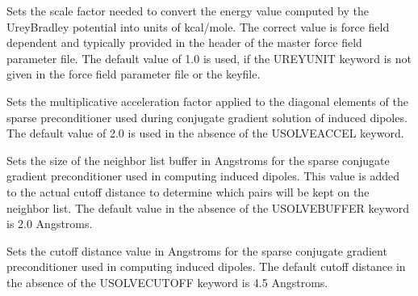 \documentclass[letterpaper,11pt,english]{sphinxmanual}
\begin{document}
\ignorespaces {}\label{\detokenize{text/keywords:key-ureyunit}}\begin{description}
\sphinxAtStartPar
Sets the scale factor needed to convert the energy value computed by the Urey\sphinxhyphen{}Bradley potential into units of kcal/mole. The correct value is force field dependent and typically provided in the header of the master force field parameter file. The default value of 1.0 is used, if the UREYUNIT keyword is not given in the force field parameter file or the keyfile.

\end{description}

\ignorespaces {}\label{\detokenize{text/keywords:key-usolve-accel}}\begin{description}
\sphinxAtStartPar
Sets the multiplicative acceleration factor applied to the diagonal elements of the sparse preconditioner used during conjugate gradient solution of induced dipoles. The default value of 2.0 is used in the absence of the USOLVE\sphinxhyphen{}ACCEL keyword.

\end{description}

\ignorespaces {}\label{\detokenize{text/keywords:key-usolve-buffer}}\begin{description}
\sphinxAtStartPar
Sets the size of the neighbor list buffer in Angstroms for the sparse conjugate gradient preconditioner used in computing induced dipoles. This value is added to the actual cutoff distance to determine which pairs will be kept on the neighbor list. The default value in the absence of the USOLVE\sphinxhyphen{}BUFFER keyword is 2.0 Angstroms.

\end{description}

\ignorespaces {}\label{\detokenize{text/keywords:key-usolve-cutoff}}\begin{description}
\sphinxAtStartPar
Sets the cutoff distance value in Angstroms for the sparse conjugate gradient preconditioner used in computing induced dipoles. The default cutoff distance in the absence of the USOLVE\sphinxhyphen{}CUTOFF keyword is 4.5 Angstroms.

\end{description}
\end{document}
